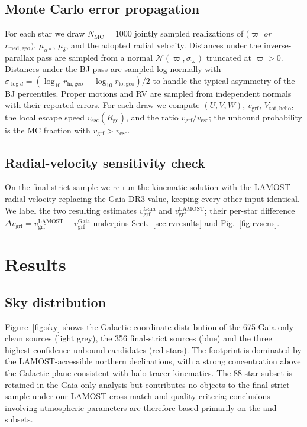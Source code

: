 \documentclass{caosp310}
\newcommand{\vgrf}{v_{\mathrm{grf}}}
\newcommand{\Vtot}{V_{\mathrm{tot,helio}}}
\newcommand{\vesc}{v_{\mathrm{esc}}}
\newcommand{\Rgc}{R_{\mathrm{gc}}}
\newcommand{\dBJ}{r_{\mathrm{med,geo}}}
\begin{document}
\subsection{Monte Carlo error propagation}
\label{sec:mc}

For each star we draw $N_{\mathrm{MC}}=1000$ jointly sampled realizations
of $(\varpi$ \emph{or} $\dBJ)$, $\mu_{\alpha*}$, $\mu_\delta$, and the
adopted radial velocity. Distances under the inverse-parallax pass are
sampled from a normal $\mathcal{N}(\varpi,\sigma_\varpi)$ truncated at
$\varpi>0$. Distances under the BJ pass are sampled log-normally with
$\sigma_{\log d}=(\log_{10}r_{\mathrm{hi,geo}}-\log_{10}r_{\mathrm{lo,geo}})/2$
to handle the typical asymmetry of the BJ percentiles. Proper motions and
RV are sampled from independent normals with their reported errors. For
each draw we compute $(U,V,W)$, $\vgrf$, $\Vtot$, the local escape speed
$\vesc(\Rgc)$, and the ratio $\vgrf/\vesc$; the unbound probability is
the MC fraction with $\vgrf>\vesc$.

\subsection{Radial-velocity sensitivity check}
\label{sec:rvcheck}

On the final-strict sample we re-run the kinematic solution with the
LAMOST radial velocity replacing the Gaia DR3 value, keeping every other
input identical. We label the two resulting estimates
$\vgrf^{\mathrm{Gaia}}$ and $\vgrf^{\mathrm{LAMOST}}$; their per-star
difference $\Delta\vgrf = \vgrf^{\mathrm{LAMOST}} - \vgrf^{\mathrm{Gaia}}$
underpins Sect.~\ref{sec:rvresults} and Fig.~\ref{fig:rvsens}.

\section{Results}
\label{sec:results}

\subsection{Sky distribution}
\label{sec:sky}

Figure~\ref{fig:sky} shows the Galactic-coordinate distribution of the
675 Gaia-only-clean sources (light grey), the 356 final-strict sources
(blue) and the three highest-confidence unbound candidates (red stars).
The footprint is dominated by the LAMOST-accessible northern declinations,
with a strong concentration above the Galactic plane consistent with
halo-tracer kinematics. The 88-star \citet{Li2023ExtremeVelocity88} subset
is retained in the Gaia-only analysis but contributes no objects to the
final-strict sample under our LAMOST cross-match and quality criteria;
conclusions involving atmospheric parameters are therefore based primarily
on the \citet{Li2021HVS591} and \citet{Liao2024HVS519} subsets.
\end{document}
